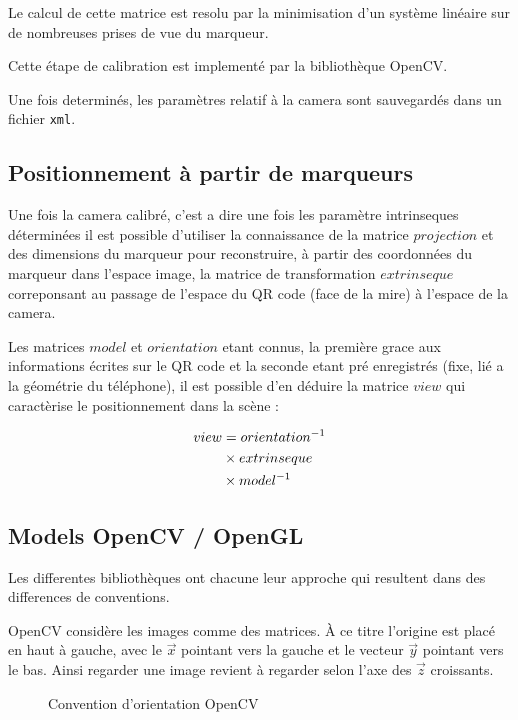 \documentclass[10pt,a4paper,twoside, twocolumn]{report}
\newcommand*{\rootPath}{../}
\begin{document}
Le calcul de cette matrice est resolu par la minimisation d'un système linéaire sur de nombreuses prises de vue du marqueur. 

Cette étape de calibration est implementé par la bibliothèque OpenCV.

Une fois determinés, les paramètres relatif à la camera sont sauvegardés dans un fichier \texttt{xml}.

\subsection{Positionnement à partir de marqueurs}\label{section:positionnement}

Une fois la camera calibré, c'est a dire une fois les paramètre intrinseques déterminées il est possible d'utiliser la connaissance de la matrice $projection$ et des dimensions du marqueur pour reconstruire, à partir des coordonnées du marqueur dans l'espace image, la matrice de transformation $extrinseque$ correponsant au passage de l'espace du QR code (face de la mire) à l'espace de la camera.

Les matrices $model$ et $orientation$ etant connus, la première grace aux informations écrites sur le QR code et la seconde etant pré enregistrés (fixe, lié a la géométrie du téléphone), il est possible d'en déduire la matrice $view$ qui caractèrise le positionnement dans la scène :

\begin{align}
	view	&=			orientation^{-1}	\notag \\
				&\times extrinseque				\notag \\
				&\times model^{-1}
\end{align}

\subsection{Models OpenCV / OpenGL}

Les differentes bibliothèques ont chacune leur approche qui resultent dans des differences de conventions.

OpenCV considère les images comme des matrices. À ce titre l'origine est placé en haut à gauche, avec le $\vec x$ pointant vers la gauche et le vecteur $\vec y$ pointant vers le bas. Ainsi regarder une image revient à regarder selon l'axe des $\vec z$ croissants.

\begin{figure}[!ht]
	\centering
	
	\caption{Convention d'orientation OpenCV}
	\label{fig:tikz:space-opencv}
\end{figure}
\end{document}

